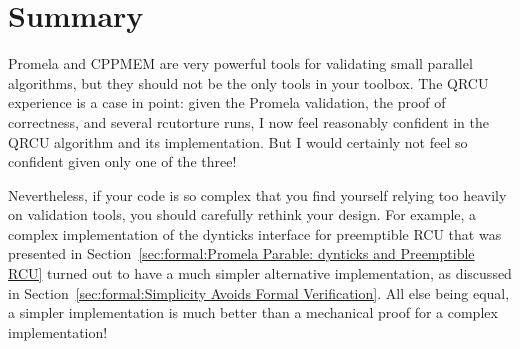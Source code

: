 



\section{Summary}
\label{sec:formal:Summary}

Promela and CPPMEM are very powerful tools for validating small
parallel algorithms, but they should not be the only tools in your
toolbox.
The QRCU experience is a case in point: given the Promela validation,
the proof of correctness, and several
rcutorture
runs, I now feel
reasonably confident in the QRCU algorithm and its implementation.
But I would certainly not feel so confident given only one of the three!

Nevertheless, if your code is so complex that you find yourself
relying too heavily on validation
tools, you should carefully rethink your design.
For example, a complex implementation of the dynticks interface for
preemptible RCU that was presented in
Section~\ref{sec:formal:Promela Parable: dynticks and Preemptible RCU}
turned out to
have a much simpler alternative implementation, as discussed in
Section~\ref{sec:formal:Simplicity Avoids Formal Verification}.
All else being equal, a simpler implementation is much better than
a mechanical proof for a complex implementation!
